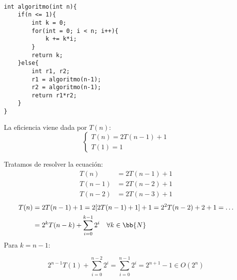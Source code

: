 \begin{ejemplo}
\ \\
\begin{listing}[H]
\begin{verbatim}
int algoritmo(int n){
    if(n <= 1){
        int k = 0;
        for(int = 0; i < n; i++){
            k += k*i;
        }
        return k;
    }else{
        int r1, r2;
        r1 = algoritmo(n-1);
        r2 = algoritmo(n-1);
        return r1*r2;
    }
}
\end{verbatim}
\end{listing}
La eficiencia viene dada por $T(n)$:
\begin{equation*}
    \left\{ \begin{array}{l}
        T(n) = 2T(n-1) +1 \\
        T(1) = 1
    \end{array}\right.
\end{equation*}

Tratamos de resolver la ecuación:
\begin{align*}
    T(n) &= 2T(n-1) + 1\\
    T(n-1) &= 2T(n-2) + 1\\
    T(n-2) &= 2T(n-3) + 1
\end{align*}
\begin{align*}
    T(n) &= 2T(n-1) +1=2[2T(n-1)+1]+1 = 2^2T(n-2)+2+1 = \ldots\\
         &= 2^k T(n-k) + \sum_{i=0}^{k-1} 2^i \quad \forall k \in \bb{N}
\end{align*}
Para $k = n-1$:  
  
\begin{equation*}
2^{n-1}T(1) + \sum_{i=0}^{n-2} 2^i = \sum_{i=0}^{n-1} 2^i = 2^{n+1}-1\in O(2^n)
\end{equation*}
\end{ejemplo}

